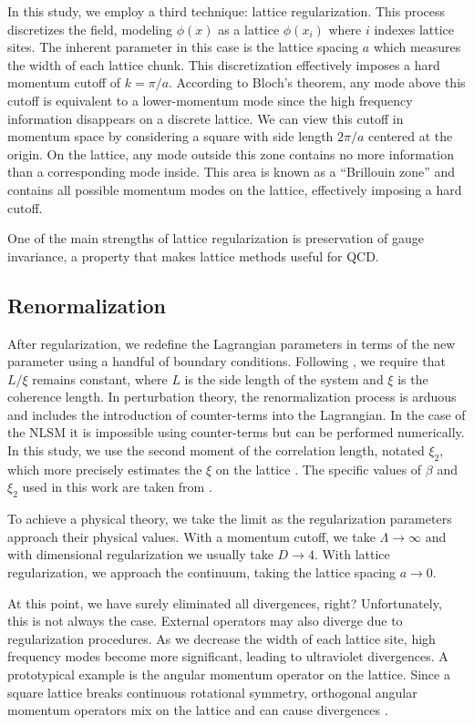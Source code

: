 In this study, we employ a third technique: lattice regularization. This process discretizes the field, modeling $\phi(x)$ as a lattice $\phi(x_i)$ where $i$ indexes lattice sites. The inherent parameter in this case is the lattice spacing $a$ which measures the width of each lattice chunk. This discretization effectively imposes a hard momentum cutoff of $k=\pi/a$. According to Bloch's theorem, any mode above this cutoff is equivalent to a lower-momentum mode since the high frequency information disappears on a discrete lattice. We can view this cutoff in momentum space by considering a square with side length $2\pi/a$ centered at the origin. On the lattice, any mode outside this zone contains no more information than a corresponding mode inside. This area is known as a ``Brillouin zone'' and contains all possible momentum modes on the lattice, effectively imposing a hard cutoff. 

One of the main strengths of lattice regularization is preservation of gauge invariance, a property that makes lattice methods useful for QCD.


\subsection{Renormalization}
After regularization, we redefine the Lagrangian parameters in terms of the new parameter using a handful of boundary conditions. Following \cite{bietenholz2018}, we require that $L/\xi$ remains constant, where $L$ is the side length of the system and $\xi$ is the coherence length. In perturbation theory, the renormalization process is arduous and includes the introduction of counter-terms into the Lagrangian. In the case of the NLSM it is impossible using counter-terms but can be performed numerically. In this study, we use the second moment of the correlation length, notated $\xi_2$, which more precisely estimates the $\xi$ on the lattice \cite{bietenholz2018}. The specific values of $\beta$ and $\xi_2$ used in this work are taken from \cite{bietenholz2018}.

To achieve a physical theory, we take the limit as the regularization parameters approach their physical values. With a momentum cutoff, we take $\Lambda \rightarrow \infty$ and with dimensional regularization we usually take $D\rightarrow 4$. With lattice regularization, we approach the continuum, taking the lattice spacing $a\rightarrow 0$. 

At this point, we have surely eliminated all divergences, right? Unfortunately, this is not always the case. External operators may also diverge due to regularization procedures. As we decrease the width of each lattice site, high frequency modes become more significant, leading to ultraviolet divergences. A prototypical example is the angular momentum operator on the lattice. Since a square lattice breaks continuous rotational symmetry, orthogonal angular momentum operators mix on the lattice and can cause divergences \cite{monahan2016}. 

